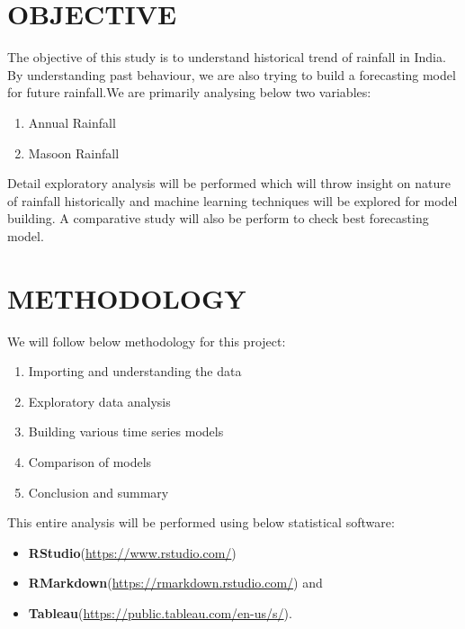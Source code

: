 \documentclass[12pt,openany]{book}
\providecommand{\tightlist}{%
  \setlength{\itemsep}{0pt}\setlength{\parskip}{0pt}}
\begin{document}
\hypertarget{objective}{%
\chapter{OBJECTIVE}\label{objective}}

The objective of this study is to understand historical trend of rainfall in India. By understanding past behaviour, we are also trying to build a forecasting model for future rainfall.We are primarily analysing below two variables:

\begin{enumerate}
\def\labelenumi{\arabic{enumi}.}
\tightlist
\item
  Annual Rainfall
\item
  Masoon Rainfall
\end{enumerate}

Detail exploratory analysis will be performed which will throw insight on nature of rainfall historically and machine learning techniques will be explored for model building.
A comparative study will also be perform to check best forecasting model.

\hypertarget{methodology}{%
\chapter{METHODOLOGY}\label{methodology}}

We will follow below methodology for this project:

\begin{enumerate}
\def\labelenumi{\arabic{enumi}.}
\tightlist
\item
  Importing and understanding the data
\item
  Exploratory data analysis
\item
  Building various time series models
\item
  Comparison of models\\
\item
  Conclusion and summary
\end{enumerate}

This entire analysis will be performed using below statistical software:

\begin{itemize}
\tightlist
\item
  \textbf{RStudio}(\url{https://www.rstudio.com/})
\item
  \textbf{RMarkdown}(\url{https://rmarkdown.rstudio.com/}) and
\item
  \textbf{Tableau}(\url{https://public.tableau.com/en-us/s/}).
\end{itemize}
\end{document}
